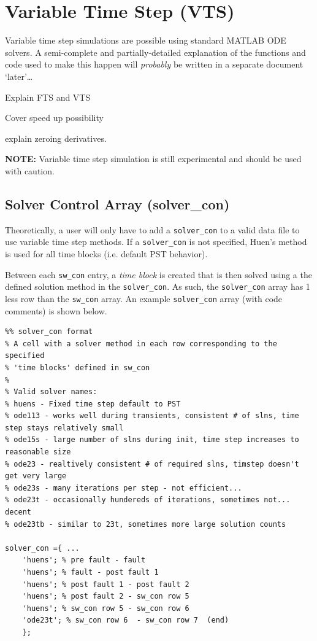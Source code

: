 \section{Variable Time Step (VTS)}  
Variable time step simulations are possible using standard MATLAB ODE solvers.
A semi-complete and partially-detailed explanation of the functions and code used to make this happen will \emph{probably} be written in a separate document `later'\ldots

Explain FTS and VTS

Cover speed up possibility

explain zeroing derivatives.

\textbf{NOTE:} Variable time step simulation is still experimental and should be used with caution.


\subsection{Solver Control Array (solver\_con)}  
Theoretically, a user will only have to add a \verb|solver_con| to a valid data file to use variable time step methods.
If a \verb|solver_con| is not specified, Huen's method is used for all time blocks (i.e. default PST behavior).

Between each \verb|sw_con| entry, a \emph{time block} is created that is then solved using a the defined solution method in the \verb|solver_con|.
As such, the \verb|solver_con| array has 1 less row than the \verb|sw_con| array.
An example \verb|solver_con| array (with code comments) is shown below.
\begin{verbatim}
%% solver_con format
% A cell with a solver method in each row corresponding to the specified
% 'time blocks' defined in sw_con
%
% Valid solver names:
% huens - Fixed time step default to PST
% ode113 - works well during transients, consistent # of slns, time step stays relatively small
% ode15s - large number of slns during init, time step increases to reasonable size
% ode23 - realtively consistent # of required slns, timstep doesn't get very large
% ode23s - many iterations per step - not efficient...
% ode23t - occasionally hundereds of iterations, sometimes not... decent
% ode23tb - similar to 23t, sometimes more large solution counts

solver_con ={ ...
    'huens'; % pre fault - fault
    'huens'; % fault - post fault 1
    'huens'; % post fault 1 - post fault 2
    'huens'; % post fault 2 - sw_con row 5
    'huens'; % sw_con row 5 - sw_con row 6 
    'ode23t'; % sw_con row 6  - sw_con row 7  (end)
    };
\end{verbatim}


